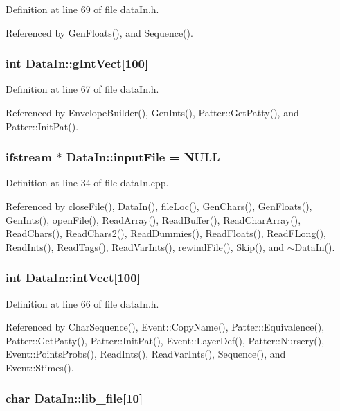 Definition at line 69 of file data\-In.h.

Referenced by Gen\-Floats(), and Sequence().
\subsubsection{\setlength{\rightskip}{0pt plus 5cm}int {\bf Data\-In::g\-Int\-Vect}[100]}\label{classDataIn_o1}




Definition at line 67 of file data\-In.h.

Referenced by Envelope\-Builder(), Gen\-Ints(), Patter::Get\-Patty(), and Patter::Init\-Pat().
\subsubsection{\setlength{\rightskip}{0pt plus 5cm}ifstream $\ast$ {\bf Data\-In::input\-File} = NULL\hspace{0.3cm}{\tt  [static]}}\label{classDataIn_s0}




Definition at line 34 of file data\-In.cpp.

Referenced by close\-File(), Data\-In(), file\-Loc(), Gen\-Chars(), Gen\-Floats(), Gen\-Ints(), open\-File(), Read\-Array(), Read\-Buffer(), Read\-Char\-Array(), Read\-Chars(), Read\-Chars2(), Read\-Dummies(), Read\-Floats(), Read\-FLong(), Read\-Ints(), Read\-Tags(), Read\-Var\-Ints(), rewind\-File(), Skip(), and $\sim$Data\-In().
\subsubsection{\setlength{\rightskip}{0pt plus 5cm}int {\bf Data\-In::int\-Vect}[100]}\label{classDataIn_o0}




Definition at line 66 of file data\-In.h.

Referenced by Char\-Sequence(), Event::Copy\-Name(), Patter::Equivalence(), Patter::Get\-Patty(), Patter::Init\-Pat(), Event::Layer\-Def(), Patter::Nursery(), Event::Points\-Probs(), Read\-Ints(), Read\-Var\-Ints(), Sequence(), and Event::Stimes().
\subsubsection{\setlength{\rightskip}{0pt plus 5cm}char {\bf Data\-In::lib\_\-file}[10]}\label{classDataIn_o15}




